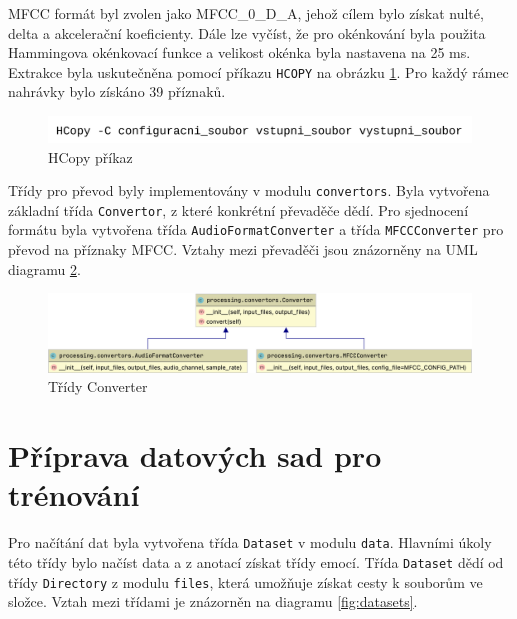 \documentclass[FM,BP]{tulthesis}
\begin{document}
MFCC formát byl zvolen jako MFCC\_0\_D\_A, jehož cílem bylo získat nulté, delta a akcelerační koeficienty. Dále lze vyčíst, že pro okénkování byla použita Hammingova okénkovací funkce a velikost okénka byla nastavena na 25 ms. Extrakce byla uskutečněna pomocí příkazu \texttt{\mbox{HCOPY}} na obrázku \mbox{\ref{fig:htk}}. Pro každý rámec nahrávky bylo získáno 39 příznaků.

\begin{figure}[htbp]
\centerline{\includegraphics[width=\textwidth,height=\textheight,keepaspectratio]{htk_command.png}}
\caption{HCopy příkaz}
\label{fig:htk}
\end{figure}
\FloatBarrier

Třídy pro převod byly implementovány v modulu \texttt{\mbox{convertors}}. Byla vytvořena základní třída \texttt{\mbox{Convertor}}, z které konkrétní převaděče dědí. Pro sjednocení formátu byla vytvořena třída \texttt{\mbox{AudioFormatConverter}} a třída \texttt{\mbox{MFCCConverter}} pro převod na příznaky MFCC. Vztahy mezi převaděči jsou znázorněny na UML diagramu \mbox{\ref{fig:convertor}}.

\begin{figure}[ht]
\centerline{\includegraphics[width=\textwidth,height=\textheight,keepaspectratio]{convertors.png}}
\caption{Třídy Converter}
\label{fig:convertor}
\end{figure}
\FloatBarrier

\section{Příprava datových sad pro trénování} %
Pro načítání dat byla vytvořena třída \texttt{\mbox{Dataset}} v modulu \texttt{\mbox{data}}. Hlavními úkoly této třídy bylo načíst data a z anotací získat třídy emocí. Třída \texttt{\mbox{Dataset}} dědí od třídy \texttt{\mbox{Directory}} z modulu \texttt{\mbox{files}}, která umožňuje získat cesty k souborům ve složce. Vztah mezi třídami je znázorněn na diagramu \mbox{\ref{fig:datasets}}.
\end{document}
